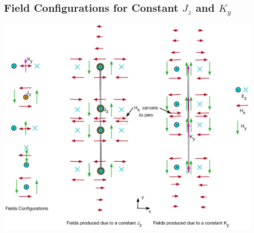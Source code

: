 \documentclass{article}
\newcommand{\0}{\varnothing}
\begin{document}
\subsection{Field Configurations for Constant $J_z$ and $K_y$}
\begin{minipage}{0.55\textwidth}
\begin{center}
\includegraphics[width=1\columnwidth]{figures/FieldsSeg}
\end{center}
\end{minipage}
\end{document}
